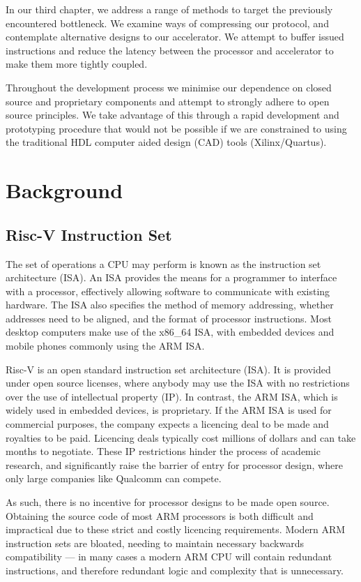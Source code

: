 \documentclass[a4paper,8pt]{report}
\begin{document}
In our third chapter, we address a range of methods to target the previously
encountered bottleneck. We examine ways of compressing our protocol, and
contemplate alternative designs to our accelerator. We attempt to buffer issued
instructions and reduce the latency between the processor and accelerator to
make them more tightly coupled.

Throughout the development process we minimise our dependence on closed source
and proprietary components and attempt to strongly adhere to open source
principles. We take advantage of this through a rapid development and
prototyping procedure that would not be possible if we are constrained to using
the traditional HDL computer aided design (CAD) tools (Xilinx/Quartus).


\chapter{Background}
\section{Risc-V Instruction Set}
The set of operations a CPU may perform is known as the instruction set
architecture (ISA). An ISA provides the means for a programmer to interface with
a processor, effectively allowing software to communicate with existing
hardware. The ISA also specifies the method of memory addressing, whether
addresses need to be aligned, and the format of processor instructions. Most
desktop computers make use of the x86\_64 ISA, with embedded devices and mobile
phones commonly using the ARM ISA\cite{arm-manual}.

Risc-V\cite{Waterman:EECS-2014-54} is an open standard instruction set architecture (ISA). It is provided
under open source licenses, where anybody may use the ISA with no restrictions
over the use of intellectual property (IP). In contrast, the ARM ISA, which is widely
used in embedded devices, is proprietary. If the ARM ISA is used
for commercial purposes, the company expects a licencing deal to be made and
royalties to be paid. Licencing deals typically cost millions of dollars and can
take months to negotiate. These IP restrictions hinder the process of academic
research, and significantly raise the barrier of entry for processor design,
where only large companies like Qualcomm can compete.

As such, there is no incentive for processor designs to be made open source.
Obtaining the source code of most ARM processors is both difficult and
impractical due to these strict and costly licencing requirements. Modern ARM
instruction sets are bloated, needing to maintain necessary backwards
compatibility --- in many cases a modern ARM CPU will contain redundant
instructions, and therefore redundant logic and complexity that is unnecessary.
\end{document}
